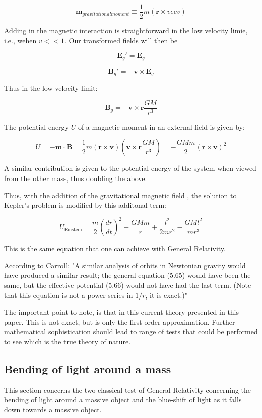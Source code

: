 \documentclass {article}
\renewcommand\vec{\mathbf}
\begin{document}
$$\vec m_{gravitational moment} \equiv \frac 1 {2} m (\vec r \times vec v)$$

Adding in the magnetic interaction is straightforward in the low velocity limie, i.e., wehen $v << 1$. Our transformed fields will then be

$$\vec E_g' = \vec E_g$$

$$ \vec B_g' = - \vec v \times \vec E_g$$

Thus in the low velocity limit:

$$\vec B_g = - \vec v \times \vec r \frac {GM} {r^3} $$ 

The potential energy $U$ of a magnetic moment in an external field is given by:

$$U = - \vec m \cdot \vec B = \frac 1 2 m (\vec r \times \vec v)\left(\vec v \times \vec r \frac {GM} {r^3} \right) = - \frac {GMm} 2 (\vec r \times \vec v)^2$$

A similar contribution is given to the potential energy of the system when viewed from the other mass, thus doubling the above. 

Thus, with the addition of the gravitational magnetic field , the solution to Kepler's problem is modified by this additonal term:

$$ U_{\text{Einstein}} = \frac m 2 (\frac {dr} {dt})^2 - \frac {GMm} r + \frac {l^2} {2mr^2} - \frac {GMl^2}{mr^3}$$

This is the same equation that one can achieve with General Relativity. 

According to Carroll: "A similar analysis of orbits in Newtonian gravity would have produced a similar result; the general equation (5.65) would have been the same, but the effective potential (5.66) would not have had the last term. (Note that this equation is not a power series in $1/r$, it is exact.)"

The important point to note, is that in this current theory presented in this paper. This is not exact, but is only the first order approximation. Further mathematical sophistication should lead to range of tests that could be performed to see which is the true theory of nature.


\newpage
\subsection{Bending of light around a mass}
This section concerns the two classical test of General Relativity concerning the bending of light around a massive object and the blue-shift of light as it falls down towards a massive object.
\end{document}
